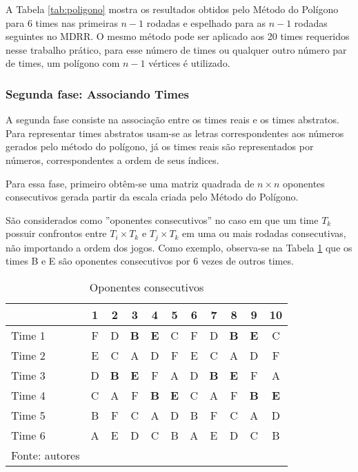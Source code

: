 \documentclass[12pt,a4paper]{article}
\begin{document}
A Tabela \ref{tab:poligono} mostra os resultados obtidos pelo Método do Polígono para $6$ times nas primeiras $n-1$ rodadas e espelhado para as $n-1$ rodadas seguintes no MDRR. O mesmo método pode ser aplicado aos 20 times requeridos nesse trabalho prático, para esse número de times ou qualquer outro número par de times, um polígono com $n-1$ vértices é utilizado.

\subsubsection{Segunda fase: Associando Times}

A segunda fase consiste na associação entre os times reais e os times abstratos. Para representar times abstratos usam-se as letras correspondentes aos números gerados pelo método do polígono, já os times reais são representados por números, correspondentes a ordem de seus índices.

Para essa fase, primeiro obtêm-se uma matriz quadrada de $n \times n$ oponentes consecutivos gerada partir da escala criada pelo Método do Polígono.

São considerados como ''oponentes consecutivos'' no caso em que um time $T_{k}$ possuir confrontos entre $T_{i} \times T_{k}$ e $T_{j} \times T_{k}$ em uma ou mais rodadas consecutivas, não importando a ordem dos jogos. Como exemplo, observa-se na Tabela \ref{tab:consecutivos} que os times B e E são oponentes consecutivos por 6 vezes de outros times.

\begin{table}[H]
	\centering
	\caption{Oponentes consecutivos}
	\label{tab:consecutivos}
	\begin{tabular}{l*{10}{c}}
		\toprule
		& 1 & 2 & 3 & 4 & 5 & 6 & 7 & 8 & 9 & 10 \\
		\midrule
		Time 1 & F & D & \textbf{B} & \textbf{E} & C & F & D & \textbf{B} & \textbf{E} & C \\
		Time 2 & E & C & A & D & F & E & C & A & D & F \\
		Time 3 & D & \textbf{B} & \textbf{E} & F & A & D & \textbf{B} & \textbf{E} & F & A \\
		Time 4 & C & A & F & \textbf{B} & \textbf{E} & C & A & F & \textbf{B} & \textbf{E} \\
		Time 5 & B & F & C & A & D & B & F & C & A & D \\
		Time 6 & A & E & D & C & B & A & E & D & C & B \\
		\bottomrule
		\footnotesize Fonte: autores
	\end{tabular}
\end{table}
\end{document}
